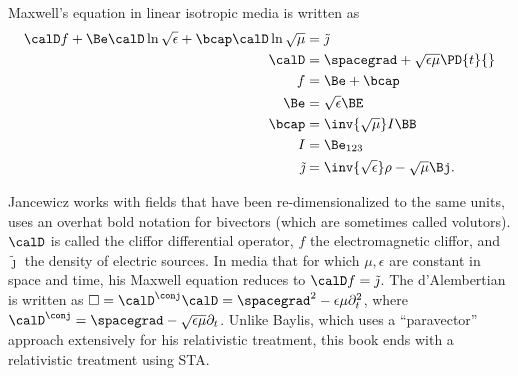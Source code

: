 Maxwell's equation in linear isotropic media is written as
\begin{equation}\label{eqn:galiterature:20}
\begin{aligned}
\calD f + \Be \calD \ln \sqrt{\epsilon} + \bcap \calD \ln \sqrt{\mu} &= \tilde{\jmath} \\
\calD &= \spacegrad + \sqrt{\epsilon\mu} \PD{t}{} \\
f &= \Be + \bcap \\
\Be &= \sqrt{\epsilon} \BE \\
\bcap &= \inv{\sqrt{\mu}} I \BB \\
I &= \Be_{123} \\
\tilde{\jmath} &= \inv{\sqrt{\epsilon}}\rho - \sqrt{\mu} \Bj.
\end{aligned}
\end{equation}

Jancewicz works with fields that have been re-dimensionalized to the same units, uses an overhat bold notation for bivectors (which are sometimes called volutors).
\( \calD \) is called the cliffor differential operator, \( f \) the electromagnetic cliffor, and \( \tilde{\jmath} \) the density of electric sources.
In media that for which \( \mu, \epsilon \) are constant in space and time, his Maxwell equation reduces to \( \calD f = \tilde{\jmath} \).
The d'Alembertian is written
as \( \Box = \calD^\conj \calD = \spacegrad^2 - \epsilon\mu \partial_t^2 \), where
\( \calD^\conj = \spacegrad - \sqrt{\epsilon\mu} \partial_t \).
Unlike Baylis, which uses a
``paravector'' approach extensively for his relativistic treatment,
this book ends with a relativistic treatment using STA.

